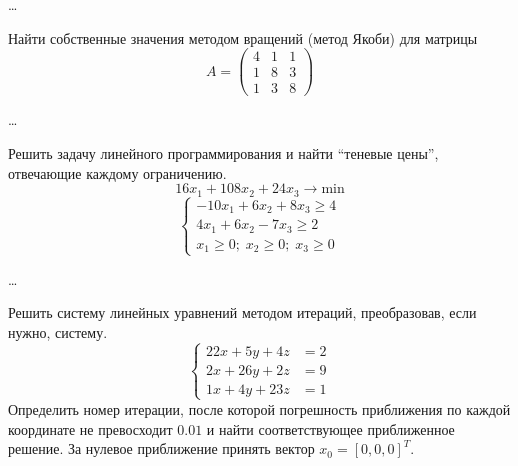 \ldots


\begin{problem}
    Найти собственные значения методом вращений (метод Якоби) для матрицы
    \begin{equation*}
        A = \begin{pmatrix}
            4 & 1 & 1\\
            1 & 8 & 3\\
            1 & 3 & 8
        \end{pmatrix}
    \end{equation*}
\end{problem}

\ldots


\begin{problem}
    Решить задачу линейного программирования и найти ``теневые цены'', отвечающие
    каждому ограничению.
    \begin{equation*}
        16x_1 + 108x_2 + 24x_3 \to \text{min}
    \end{equation*}
    \begin{equation*}
        \begin{cases}
            -10x_1 + 6x_2 + 8x_3 \geq 4\\
            4x_1 + 6x_2 - 7x_3 \geq 2\\
            x_1 \geq 0; \; x_2 \geq 0; \; x_3 \geq 0
        \end{cases}
    \end{equation*}
\end{problem}

\ldots


\begin{problem}
    Решить систему линейных уравнений методом итераций, преобразовав, если
    нужно, систему.
    \begin{equation*}
        \begin{cases}
            22x + 5y + 4z &= 2\\
            2x + 26y + 2z &= 9\\
            1x + 4y + 23z &= 1
        \end{cases}
    \end{equation*}
    Определить номер итерации, после которой погрешность приближения по каждой
    координате не превосходит $0.01$ и найти соответствующее приближенное
    решение. За нулевое приближение принять вектор $x_0 = [0, 0, 0]^T$.
\end{problem}

